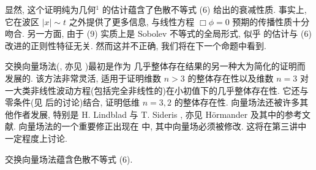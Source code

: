 \begin{remark}\label{rem:1.7}
显然, 这个证明纯为几何$^{1}$ 的估计蕴含了色散不等式 (6) 给出的衰减性质. 事实上, 它在波区 $|x| \sim t$ 之外提供了更多信息, 与线性方程 $\Box \phi = 0$ 预期的传播性质十分吻合. 另一方面, 由于 (9) 实质上是 Sobolev 不等式的全局形式, 似乎 的估计与 (6) 改进的正则性特征无关. 然而这并不正确, 我们将在下一个命题中看到.\end{remark}

\begin{remark}\label{rem:1.8}
交换向量场法(\cite{klai27}, 亦见 \cite{klai46})最初是作为 \cite{klai17} 几乎整体存在结果的另一种大为简化的证明而发展的. 该方法非常灵活, 适用于证明维数 $n>3$ 的整体存在性以及维数 $n=3$ 对一大类非线性波动方程(包括完全非线性的)在小初值下的几乎整体存在性. 它还与零条件(见 后的讨论)结合, 证明低维 $n=3,2$ 的整体存在性. 向量场法还被许多其他作者发展, 特别是 H. Lindblad \cite{klai48} 与 T. Sideris \cite{klai63,klai64,klai65}, 亦见 Hörmander \cite{klai16} 及其中的参考文献. 向量场法的一个重要修正出现在 \cite{klai12} 中, 其中向量场必须被修改. 这将在第三讲中一定程度上讨论.\end{remark}

\begin{proposition}\label{prop:1.9}
交换向量场法蕴含色散不等式 (6).\end{proposition}

